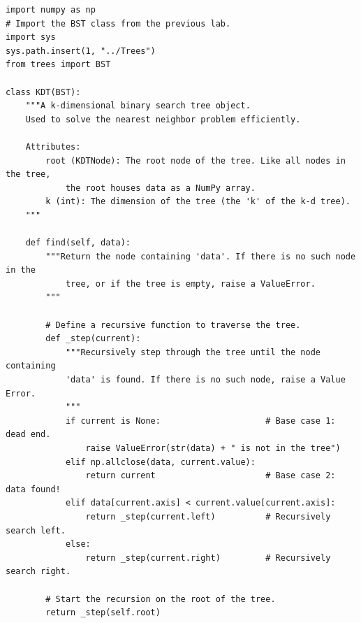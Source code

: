 \begin{lstlisting}
import numpy as np
# Import the BST class from the previous lab.
import sys
sys.path.insert(1, "../Trees")
from trees import BST

class KDT(BST):
    """A k-dimensional binary search tree object.
    Used to solve the nearest neighbor problem efficiently.

    Attributes:
        root (KDTNode): The root node of the tree. Like all nodes in the tree,
            the root houses data as a NumPy array.
        k (int): The dimension of the tree (the 'k' of the k-d tree).
    """

    def find(self, data):
        """Return the node containing 'data'. If there is no such node in the
            tree, or if the tree is empty, raise a ValueError.
        """

        # Define a recursive function to traverse the tree.
        def _step(current):
            """Recursively step through the tree until the node containing
            'data' is found. If there is no such node, raise a Value Error.
            """
            if current is None:                     # Base case 1: dead end.
                raise ValueError(str(data) + " is not in the tree")
            elif np.allclose(data, current.value):
                return current                      # Base case 2: data found!
            elif data[current.axis] < current.value[current.axis]:
                return _step(current.left)          # Recursively search left.
            else:
                return _step(current.right)         # Recursively search right.

        # Start the recursion on the root of the tree.
        return _step(self.root)
\end{lstlisting}

